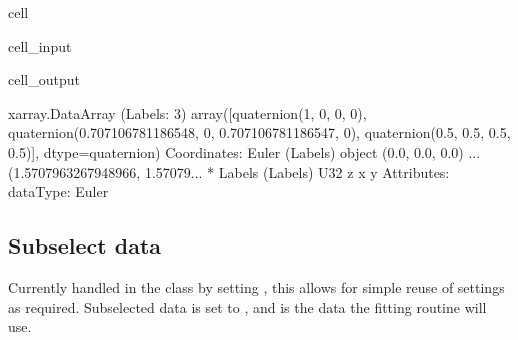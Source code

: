 \documentclass[letterpaper,table,10pt,english]{jupyterBook}
\begin{document}
\begin{sphinxuseclass}{cell}\begin{sphinxVerbatimInput}

\begin{sphinxuseclass}{cell_input}
\begin{sphinxVerbatim}[commandchars=\\\{\}]
\PYG{p}{[}\PYG{p}{]}\PYG{p}{[}\PYG{p}{]}
\end{sphinxVerbatim}

\end{sphinxuseclass}\end{sphinxVerbatimInput}
\begin{sphinxVerbatimOutput}

\begin{sphinxuseclass}{cell_output}
\begin{sphinxVerbatim}[commandchars=\\\{\}]
\PYGZlt{}xarray.DataArray (Labels: 3)\PYGZgt{}
array([quaternion(1, \PYGZhy{}0, 0, 0),
       quaternion(0.707106781186548, \PYGZhy{}0, 0.707106781186547, 0),
       quaternion(0.5, \PYGZhy{}0.5, 0.5, 0.5)], dtype=quaternion)
Coordinates:
    Euler    (Labels) object (0.0, 0.0, 0.0) ... (1.5707963267948966, 1.57079...
  * Labels   (Labels) \PYGZlt{}U32 \PYGZsq{}z\PYGZsq{} \PYGZsq{}x\PYGZsq{} \PYGZsq{}y\PYGZsq{}
Attributes:
    dataType:  Euler
\end{sphinxVerbatim}

\end{sphinxuseclass}\end{sphinxVerbatimOutput}

\end{sphinxuseclass}

\subsection{Subselect data}
\label{\detokenize{part2/basic_fitting_numerics_intro_260423:subselect-data}}
\sphinxAtStartPar
Currently handled in the class by setting , this allows for simple reuse of settings as required. Subselected data is set to , and is the data the fitting routine will use.
\end{document}
